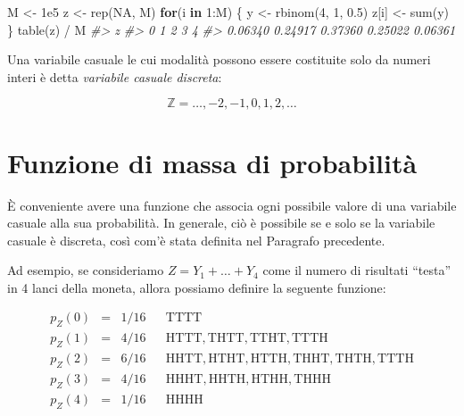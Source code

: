 \documentclass[
  11pt,
]{krantz}
\makeatletter
\newenvironment{Shaded}{\begin{snugshade}}{\end{snugshade}}
\newcommand{\CommentTok}[1]{\textcolor[rgb]{0.37,0.37,0.37}{\textit{#1}}}
\newcommand{\ConstantTok}[1]{\textcolor[rgb]{0,0,0}{#1}}
\newcommand{\ControlFlowTok}[1]{\textcolor[rgb]{0.27,0.27,0.27}{\textbf{#1}}}
\newcommand{\DecValTok}[1]{\textcolor[rgb]{0.06,0.06,0.06}{#1}}
\newcommand{\FloatTok}[1]{\textcolor[rgb]{0.06,0.06,0.06}{#1}}
\newcommand{\FunctionTok}[1]{\textcolor[rgb]{0,0,0}{#1}}
\newcommand{\NormalTok}[1]{#1}
\newcommand{\OtherTok}[1]{\textcolor[rgb]{0.37,0.37,0.37}{#1}}
\newcommand{\SpecialCharTok}[1]{\textcolor[rgb]{0,0,0}{#1}}
\newenvironment{kframe}{%
\medskip{}
\setlength{\fboxsep}{.8em}
 \def\at@end@of@kframe{}%
 \ifinner\ifhmode%
  \def\at@end@of@kframe{\end{minipage}}%
  \begin{minipage}{\columnwidth}%
 \fi\fi%
 \def\FrameCommand##1{\hskip\@totalleftmargin \hskip-\fboxsep
 \colorbox{shadecolor}{##1}\hskip-\fboxsep
     \hskip-\linewidth \hskip-\@totalleftmargin \hskip\columnwidth}%
 \MakeFramed {\advance\hsize-\width
   \@totalleftmargin\z@ \linewidth\hsize
   \@setminipage}}%
 {\par\unskip\endMakeFramed%
 \at@end@of@kframe}
\renewenvironment{Shaded}{\begin{kframe}}{\end{kframe}}
\theoremstyle{definition}
\theoremstyle{definition}
\theoremstyle{definition}
\theoremstyle{definition}
\theoremstyle{remark}
\makeatother
\begin{document}
\begin{Shaded}
\begin{Highlighting}[]
\NormalTok{M }\OtherTok{\textless{}{-}} \FloatTok{1e5}
\NormalTok{z }\OtherTok{\textless{}{-}} \FunctionTok{rep}\NormalTok{(}\ConstantTok{NA}\NormalTok{, M)}
\ControlFlowTok{for}\NormalTok{(i }\ControlFlowTok{in} \DecValTok{1}\SpecialCharTok{:}\NormalTok{M) \{}
\NormalTok{  y }\OtherTok{\textless{}{-}} \FunctionTok{rbinom}\NormalTok{(}\DecValTok{4}\NormalTok{, }\DecValTok{1}\NormalTok{, }\FloatTok{0.5}\NormalTok{)}
\NormalTok{  z[i] }\OtherTok{\textless{}{-}} \FunctionTok{sum}\NormalTok{(y)}
\NormalTok{\}}
\FunctionTok{table}\NormalTok{(z) }\SpecialCharTok{/}\NormalTok{ M}
\CommentTok{\#\textgreater{} z}
\CommentTok{\#\textgreater{}       0       1       2       3       4 }
\CommentTok{\#\textgreater{} 0.06340 0.24917 0.37360 0.25022 0.06361}
\end{Highlighting}
\end{Shaded}

Una variabile casuale le cui modalità possono essere costituite solo da numeri interi è detta \emph{variabile casuale discreta}:

\[
\mathbb{Z} = \dots, -2, -1, 0, 1, 2, \dots
\]

\hypertarget{sec:fun-mass-prob}{%
\section{Funzione di massa di probabilità}\label{sec:fun-mass-prob}}

È conveniente avere una funzione che associa ogni possibile valore di una variabile casuale alla sua probabilità. In generale, ciò è possibile se e solo se la variabile casuale è discreta, così com'è stata definita nel Paragrafo precedente.

Ad esempio, se consideriamo \(Z = Y_1 + \dots + Y_4\) come il numero di risultati ``testa'' in 4 lanci della moneta, allora possiamo definire la seguente funzione:

\[
\begin{array}{rclll}
p_Z(0) & = & 1/16 & & \mathrm{TTTT}
\\
p_Z(1) & = & 4/16 & & \mathrm{HTTT, THTT, TTHT, TTTH}
\\
p_Z(2) & = & 6/16 & & \mathrm{HHTT, HTHT, HTTH, THHT, THTH, TTTH}
\\
p_Z(3) & = & 4/16 & & \mathrm{HHHT, HHTH, HTHH, THHH}
\\
p_Z(4) & = & 1/16 & & \mathrm{HHHH}
\end{array}
\]
\end{document}
